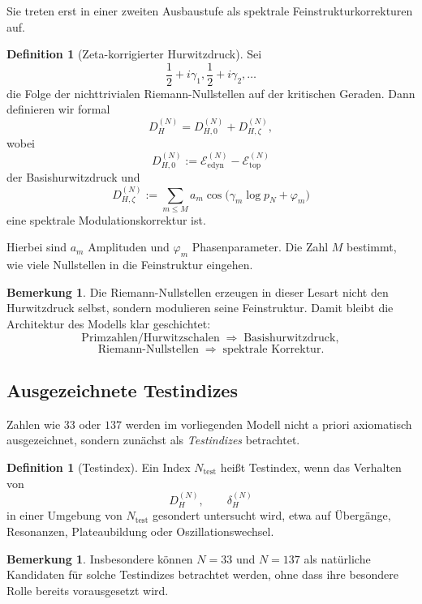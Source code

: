 \documentclass[12pt,a4paper]{article}
\theoremstyle{definition}
\newtheorem{definition}[satz]{Definition}
\newtheorem{bemerkung}[satz]{Bemerkung}
\begin{document}
	Sie treten erst in einer zweiten Ausbaustufe als spektrale Feinstrukturkorrekturen auf.
	
	\begin{definition}[Zeta-korrigierter Hurwitzdruck]
		Sei
		\[
		\frac12+i\gamma_1,\frac12+i\gamma_2,\dots
		\]
		die Folge der nichttrivialen Riemann-Nullstellen auf der kritischen Geraden. Dann definieren wir formal
		\[
		D_H^{(N)}
		=
		D_{H,0}^{(N)}+D_{H,\zeta}^{(N)},
		\]
		wobei
		\[
		D_{H,0}^{(N)}
		:=
		\mathcal{E}_{\mathrm{edyn}}^{(N)}-\mathcal{E}_{\mathrm{top}}^{(N)}
		\]
		der Basishurwitzdruck und
		\[
		D_{H,\zeta}^{(N)}
		:=
		\sum_{m\le M} a_m \cos\!\bigl(\gamma_m \log p_N+\varphi_m\bigr)
		\]
		eine spektrale Modulationskorrektur ist.
	\end{definition}
	
	Hierbei sind \(a_m\) Amplituden und \(\varphi_m\) Phasenparameter. Die Zahl \(M\) bestimmt, wie viele Nullstellen in die Feinstruktur eingehen.
	
	\begin{bemerkung}
		Die Riemann-Nullstellen erzeugen in dieser Lesart nicht den Hurwitzdruck selbst, sondern modulieren seine Feinstruktur. Damit bleibt die Architektur des Modells klar geschichtet:
		\[
		\text{Primzahlen/Hurwitzschalen}
		\;\Longrightarrow\;
		\text{Basishurwitzdruck},
		\]
		\[
		\text{Riemann-Nullstellen}
		\;\Longrightarrow\;
		\text{spektrale Korrektur}.
		\]
	\end{bemerkung}
	
	\subsection{Ausgezeichnete Testindizes}
	
	Zahlen wie \(33\) oder \(137\) werden im vorliegenden Modell nicht a priori axiomatisch ausgezeichnet, sondern zunächst als \emph{Testindizes} betrachtet.
	
	\begin{definition}[Testindex]
		Ein Index \(N_{\mathrm{test}}\) heißt Testindex, wenn das Verhalten von
		\[
		D_H^{(N)},\qquad \delta_H^{(N)}
		\]
		in einer Umgebung von \(N_{\mathrm{test}}\) gesondert untersucht wird, etwa auf Übergänge, Resonanzen, Plateaubildung oder Oszillationswechsel.
	\end{definition}
	
	\begin{bemerkung}
		Insbesondere können \(N=33\) und \(N=137\) als natürliche Kandidaten für solche Testindizes betrachtet werden, ohne dass ihre besondere Rolle bereits vorausgesetzt wird.
	\end{bemerkung}
	
\end{document}
